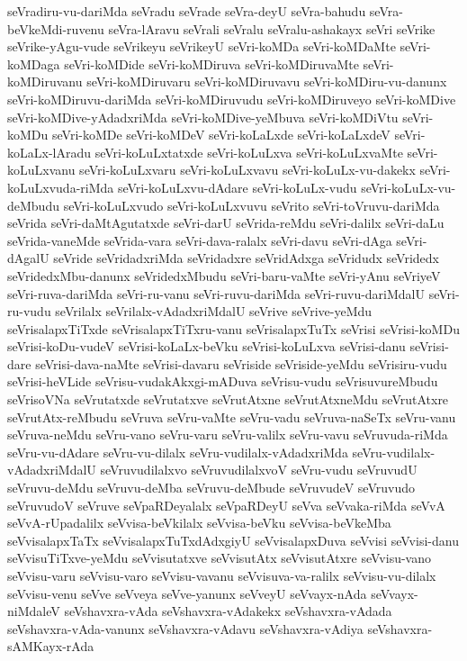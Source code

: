{seVradiru-vu-dariMda
seVradu
seVrade
seVra-deyU
seVra-bahudu
seVra-beVkeMdi-ruvenu
seVra-lAravu
seVrali
seVralu
seVralu-ashakayx
seVri
seVrike
seVrike-yAgu-vude
seVrikeyu
seVrikeyU
seVri-koMDa
seVri-koMDaMte
seVri-koMDaga
seVri-koMDide
seVri-koMDiruva
seVri-koMDiruvaMte
seVri-koMDiruvanu
seVri-koMDiruvaru
seVri-koMDiruvavu
seVri-koMDiru-vu-danunx
seVri-koMDiruvu-dariMda
seVri-koMDiruvudu
seVri-koMDiruveyo
seVri-koMDive
seVri-koMDive-yAdadxriMda
seVri-koMDive-yeMbuva
seVri-koMDiVtu
seVri-koMDu
seVri-koMDe
seVri-koMDeV
seVri-koLaLxde
seVri-koLaLxdeV
seVri-koLaLx-lAradu
seVri-koLuLxtatxde
seVri-koLuLxva
seVri-koLuLxvaMte
seVri-koLuLxvanu
seVri-koLuLxvaru
seVri-koLuLxvavu
seVri-koLuLx-vu-dakekx
seVri-koLuLxvuda-riMda
seVri-koLuLxvu-dAdare
seVri-koLuLx-vudu
seVri-koLuLx-vu-deMbudu
seVri-koLuLxvudo
seVri-koLuLxvuvu
seVrito
seVri-toVruvu-dariMda
seVrida
seVri-daMtAgutatxde
seVri-darU
seVrida-reMdu
seVri-dalilx
seVri-daLu
seVrida-vaneMde
seVrida-vara
seVri-dava-ralalx
seVri-davu
seVri-dAga
seVri-dAgalU
seVride
seVridadxriMda
seVridadxre
seVridAdxga
seVridudx
seVridedx
seVridedxMbu-danunx
seVridedxMbudu
seVri-baru-vaMte
seVri-yAnu
seVriyeV
seVri-ruva-dariMda
seVri-ru-vanu
seVri-ruvu-dariMda
seVri-ruvu-dariMdalU
seVri-ru-vudu
seVrilalx
seVrilalx-vAdadxriMdalU
seVrive
seVrive-yeMdu
seVrisalapxTiTxde
seVrisalapxTiTxru-vanu
seVrisalapxTuTx
seVrisi
seVrisi-koMDu
seVrisi-koDu-vudeV
seVrisi-koLaLx-beVku
seVrisi-koLuLxva
seVrisi-danu
seVrisi-dare
seVrisi-dava-naMte
seVrisi-davaru
seVriside
seVriside-yeMdu
seVrisiru-vudu
seVrisi-heVLide
seVrisu-vudakAkxgi-mADuva
seVrisu-vudu
seVrisuvureMbudu
seVrisoVNa
seVrutatxde
seVrutatxve
seVrutAtxne
seVrutAtxneMdu
seVrutAtxre
seVrutAtx-reMbudu
seVruva
seVru-vaMte
seVru-vadu
seVruva-naSeTx
seVru-vanu
seVruva-neMdu
seVru-vano
seVru-varu
seVru-valilx
seVru-vavu
seVruvuda-riMda
seVru-vu-dAdare
seVru-vu-dilalx
seVru-vudilalx-vAdadxriMda
seVru-vudilalx-vAdadxriMdalU
seVruvudilalxvo
seVruvudilalxvoV
seVru-vudu
seVruvudU
seVruvu-deMdu
seVruvu-deMba
seVruvu-deMbude
seVruvudeV
seVruvudo
seVruvudoV
seVruve
seVpaRDeyalalx
seVpaRDeyU
seVva
seVvaka-riMda
seVvA
seVvA-rUpadalilx
seVvisa-beVkilalx
seVvisa-beVku
seVvisa-beVkeMba
seVvisalapxTaTx
seVvisalapxTuTxdAdxgiyU
seVvisalapxDuva
seVvisi
seVvisi-danu
seVvisuTiTxve-yeMdu
seVvisutatxve
seVvisutAtx
seVvisutAtxre
seVvisu-vano
seVvisu-varu
seVvisu-varo
seVvisu-vavanu
seVvisuva-va-ralilx
seVvisu-vu-dilalx
seVvisu-venu
seVve
seVveya
seVve-yanunx
seVveyU
seVvayx-nAda
seVvayx-niMdaleV
seVshavxra-vAda
seVshavxra-vAdakekx
seVshavxra-vAdada
seVshavxra-vAda-vanunx
seVshavxra-vAdavu
seVshavxra-vAdiya
seVshavxra-sAMKayx-rAda
}
